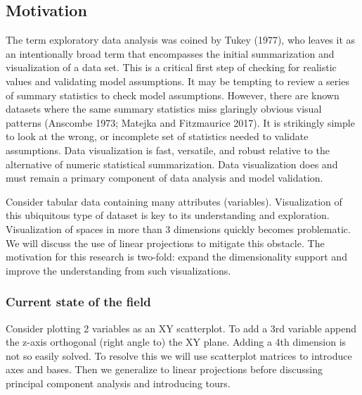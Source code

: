 \documentclass[11,]{article}
\begin{document}
\hypertarget{motivation}{%
\subsection{Motivation}\label{motivation}}

The term exploratory data analysis was coined by Tukey (1977), who leaves it as an intentionally broad term that encompasses the initial summarization and visualization of a data set. This is a critical first step of checking for realistic values and validating model assumptions. It may be tempting to review a series of summary statistics to check model assumptions. However, there are known datasets where the same summary statistics miss glaringly obvious visual patterns (Anscombe 1973; Matejka and Fitzmaurice 2017). It is strikingly simple to look at the wrong, or incomplete set of statistics needed to validate assumptions. Data visualization is fast, versatile, and robust relative to the alternative of numeric statistical summarization. Data visualization does and must remain a primary component of data analysis and model validation.

Consider tabular data containing many attributes (variables). Visualization of this ubiquitous type of dataset is key to its understanding and exploration. Visualization of spaces in more than 3 dimensions quickly becomes problematic. We will discuss the use of linear projections to mitigate this obstacle. The motivation for this research is two-fold: expand the dimensionality support and improve the understanding from such visualizations.

\hypertarget{current-state-of-the-field}{%
\subsubsection{Current state of the field}\label{current-state-of-the-field}}

Consider plotting 2 variables as an XY scatterplot. To add a 3rd variable append the z-axis orthogonal (right angle to) the XY plane. Adding a 4th dimension is not so easily solved. To resolve this we will use scatterplot matrices to introduce axes and bases. Then we generalize to linear projections before discussing principal component analysis and introducing tours.
\end{document}
